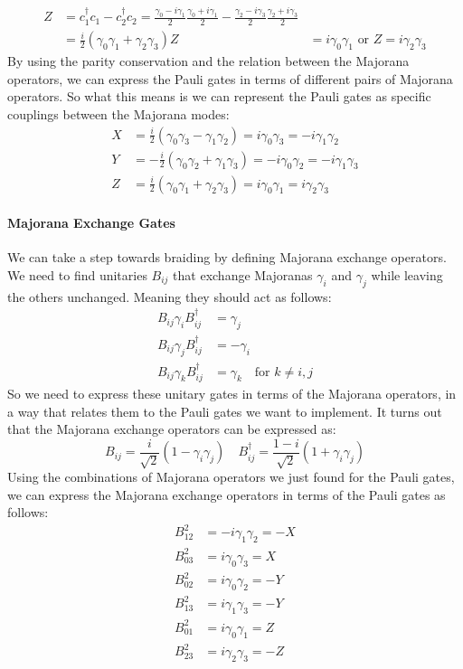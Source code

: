 \begin{align*}
  Z &= c_1^{†} c_1 - c_2^{†} c_2 = \frac{γ_0 - iγ_1}{2}\frac{γ_0 + iγ_1}{2} - \frac{γ_2 - iγ_3}{2}\frac{γ_2 + iγ_3}{2} \\
    &= \frac{i}{2} (γ_0γ_1 + γ_2γ_3)
  Z &= iγ_0γ_1 \text{ or } Z= iγ_2γ_3
\end{align*}
By using the parity conservation and the relation between the Majorana operators, we can express the Pauli gates in terms of different pairs of Majorana operators. So what this means is we can represent the Pauli gates as specific couplings between the Majorana modes:
\begin{align*}
  X &= \frac{i}{2} (γ_0γ_3 - γ_1γ_2) = iγ_0γ_3 = -iγ_1γ_2 \\
  Y &= -\frac{i}{2} (γ_0γ_2 + γ_1γ_3) = -i γ_0γ_2 = -i γ_1γ_3 \\
  Z &= \frac{i}{2} (γ_0γ_1 + γ_2γ_3) = iγ_0γ_1 = iγ_2γ_3
\end{align*}

\paragraph{Majorana Exchange Gates}
We can take a step towards braiding by defining Majorana exchange operators. We need to find unitaries $B_{ij}$ that exchange Majoranas $γ_i$ and $γ_j$ while leaving the others unchanged. Meaning they should act as follows:
\begin{align*}
B_{ij} γ_i B_{ij} ^{†} &= γ_j \\
B_{ij} γ_j B_{ij} ^{†} &= -γ_i \\
B_{ij} γ_k B_{ij} ^{†} &= γ_k \quad \text{for } k \neq i,j
\end{align*}
So we need to express these unitary gates in terms of the Majorana operators, in a way that relates them to the Pauli gates we want to implement. It turns out that the Majorana exchange operators can be expressed as:
\begin{equation}
B_{ij} = \frac{i}{\sqrt{2}} (1 - γ_i γ_j) \quad B_{ij} ^{†} = \frac{1-i}{\sqrt{2}} (1 + γ_i γ_j)
\end{equation}
Using the combinations of Majorana operators we just found for the Pauli gates, we can express the Majorana exchange operators in terms of the Pauli gates as follows:
\begin{align*}
B_{12}^2 &= -iγ_1γ_2 = -X \\
B_{03}^2 &= iγ_0γ_3 = X \\
B_{02}^2 &= iγ_0γ_2 = -Y\\
B_{13}^2 &= iγ_1γ_3 = -Y\\
B_{01}^2 &= iγ_0γ_1 =  Z\\
B_{23}^2 &= iγ_2γ_3 =  -Z
\end{align*}

